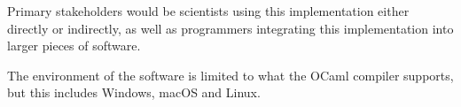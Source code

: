 \documentclass{article}
\begin{document}
Primary stakeholders would be scientists using this implementation either directly or indirectly, as well as programmers integrating this implementation into larger pieces of software.

The environment of the software is limited to what the OCaml compiler supports, but this includes Windows, macOS and Linux.

\end{document}
